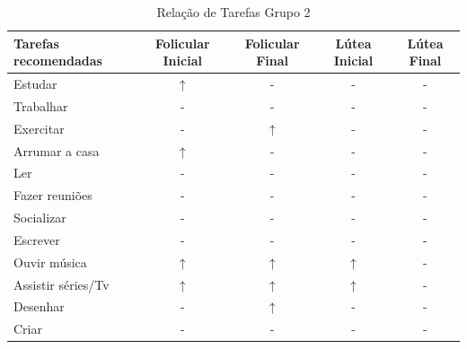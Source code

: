     \begin{table}[ht]
        \centering
        \caption{Relação de Tarefas Grupo 2}
        \label{tab12}
        \begin{tabular}{lcccc}
        \toprule
        Tarefas recomendadas  & Folicular Inicial & Folicular Final  & Lútea Inicial& Lútea Final \\ 
        \midrule
        Estudar & $\uparrow$  & -  & -  & -  \\ 
        \midrule
        Trabalhar & -  & -   & -  &  -   \\ 
        \midrule
        Exercitar & -  & $\uparrow$ & -  &  -  \\ 
        \midrule
        Arrumar a casa  & $\uparrow$ & -   & - & - \\ 
        \midrule
        Ler & - & -  & - & - \\ 
        \midrule
        Fazer reuniões & - & - & - & - \\ 
        \midrule
        Socializar & - & -  & - & - \\ 
        \midrule
        Escrever & - & -  & - & - \\ 
        \midrule
        Ouvir música & $\uparrow$ & $\uparrow$ & $\uparrow$ & - \\ 
        \midrule
        Assistir séries/Tv & $\uparrow$ & $\uparrow$ &$\uparrow$ & -\\ 
        \midrule
        Desenhar & - & $\uparrow$  & - & - \\ 
        \midrule
        Criar & - & -  & - & - \\ 
        \bottomrule    
        \end{tabular}
        \end{table}



